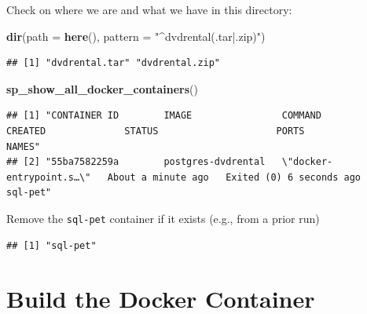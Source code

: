\documentclass[]{book}
\newenvironment{Shaded}{\begin{snugshade}}{\end{snugshade}}
\newcommand{\ControlFlowTok}[1]{\textcolor[rgb]{0.13,0.29,0.53}{\textbf{#1}}}
\newcommand{\DataTypeTok}[1]{\textcolor[rgb]{0.13,0.29,0.53}{#1}}
\newcommand{\KeywordTok}[1]{\textcolor[rgb]{0.13,0.29,0.53}{\textbf{#1}}}
\newcommand{\NormalTok}[1]{#1}
\newcommand{\OperatorTok}[1]{\textcolor[rgb]{0.81,0.36,0.00}{\textbf{#1}}}
\newcommand{\OtherTok}[1]{\textcolor[rgb]{0.56,0.35,0.01}{#1}}
\newcommand{\StringTok}[1]{\textcolor[rgb]{0.31,0.60,0.02}{#1}}
\theoremstyle{definition}
\theoremstyle{definition}
\theoremstyle{definition}
\theoremstyle{remark}
\begin{document}
Check on where we are and what we have in this directory:

\begin{Shaded}
\begin{Highlighting}[]
\KeywordTok{dir}\NormalTok{(}\DataTypeTok{path =} \KeywordTok{here}\NormalTok{(), }\DataTypeTok{pattern =} \StringTok{"^dvdrental(.tar|.zip)"}\NormalTok{)}
\end{Highlighting}
\end{Shaded}

\begin{verbatim}
## [1] "dvdrental.tar" "dvdrental.zip"
\end{verbatim}

\begin{Shaded}
\begin{Highlighting}[]
\KeywordTok{sp_show_all_docker_containers}\NormalTok{()}
\end{Highlighting}
\end{Shaded}

\begin{verbatim}
## [1] "CONTAINER ID        IMAGE                COMMAND                  CREATED              STATUS                     PORTS               NAMES"    
## [2] "55ba7582259a        postgres-dvdrental   \"docker-entrypoint.s…\"   About a minute ago   Exited (0) 6 seconds ago                       sql-pet"
\end{verbatim}

Remove the \texttt{sql-pet} container if it exists (e.g., from a prior
run)

\begin{Shaded}
\end{Shaded}

\begin{verbatim}
## [1] "sql-pet"
\end{verbatim}

\hypertarget{build-the-docker-container}{%
\section{Build the Docker Container}\label{build-the-docker-container}}
\end{document}
